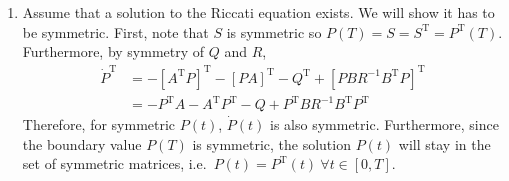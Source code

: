 \documentclass[letterpaper,11pt,titlepage]{article}
\newcommand*\dif{\mathop{}\!\mathrm{d}}
\newcommand{\trans}{^\text{T}}
\begin{document}
\begin{enumerate}[leftmargin=0pt]
\begin{enumerate}
            \item Assume that a solution to the Riccati equation exists. We will show it has to be symmetric. First, note that $S$ is symmetric so $P(T)=S=S\trans=P\trans(T)$. Furthermore, by symmetry of $Q$ and $R$,
                \begin{align}
                    \dot P\trans &= -[A\trans P]\trans - [PA]\trans - Q\trans + [PBR^{-1}B\trans P]\trans \\
                                    &= -P\trans A - A\trans P\trans - Q + P\trans B R^{-1} B\trans P\trans
                \end{align}
                Therefore, for symmetric $P(t)$, $\dot P(t)$ is also symmetric. Furthermore, since the boundary value $P(T)$ is symmetric, the solution $P(t)$ will stay in the set of symmetric matrices, i.e.\ $P(t)=P\trans(t)\ \forall t\in[0,T]$.
                
        \end{enumerate}


\end{enumerate}
\end{document}
